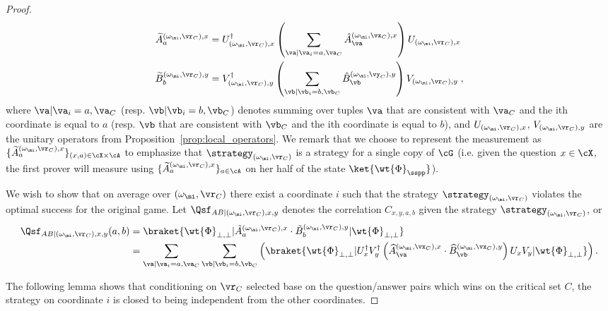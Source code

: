 \begin{proof}
	\begin{align*}
		\widetilde{A}^{(\omega_\mi,\vr_C),x}_a  = U_{(\omega_{\mi}, \vr_C),x}^\dagger \left(\sum_{\va | \va_i = a, \va_C}  \hat{A}^{(\omega_{\mi}, \vx_C),x}_\va  \right) U_{(\omega_{\mi}, \vr_C),x}\;\\
		\widetilde{B}^{(\omega_\mi,\vr_C),y}_b = V_{(\omega_{\mi}, \vr_C),y}^\dagger\left(\sum_{\vb | \vb_i = b, \vb_C}  \hat{B}^{(\omega_{\mi}, \vy_C),y}_\vb  \right) V_{(\omega_{\mi}, \vr_C),y}\;,
	\end{align*}
	where $\va | \va_i = a, \va_C$ (resp. $\vb | \vb_i = b, \vb_C$) denotes summing over tuples $\va$ that are consistent with $\va_C$ and the ith coordinate is equal to $a$ (resp. $\vb$ that are consistent with $\vb_C$  and the ith coordinate is equal to $b$), and $U_{(\omega_{\mi}, \vr_C),x}$, $V_{(\omega_{\mi}, \vr_C),y}$ are the unitary operators from Proposition~\ref{prop:local_operators}. We remark that we choose to represent the measurement as $\{\widetilde{A}^{(\omega_\mi,\vr_C),x}_a\}_{(x,a) \in \cX \times \cA}$ to emphasize that $\strategy_{(\omega_\mi,\vr_C)}$ is a strategy for a single copy of $\cG$ (i.e. given the question $x \in \cX$, the first prover will measure using $\{\widetilde{A}^{(\omega_\mi,\vr_C),x}_a\}_{a \in \cA}$ on her half of the state $\ket{\wt{\Phi}_\sspp}$). 
	
	We wish to show that on average over $(\omega_\mi,\vr_C)$ there exist a coordinate $i$ such that the strategy $\strategy_{(\omega_\mi,\vr_C)}$ violates the optimal success for the original game. Let $\Qsf_{A B | (\omega_{\mi}, \vr_C), x,y}$ denotes the correlation $C_{x,y,a,b}$ given the strategy $\strategy_{(\omega_{\mi}, \vr_C)}$, or
	\begin{align} 
		\nonumber \Qsf_{A B | (\omega_{\mi}, \vr_C), x,y}(a,b) &=   \braket{\wt{\Phi}_{\bot, \bot}| \tilde{A}^{(\omega_\mi,\vr_C),x}_a \cdot \tilde{B}^{(\omega_\mi,\vr_C),y}_b|\wt{\Phi}_{\bot, \bot}} \\
		&= \sum_{\va | \va_i = a, \va_C}\sum_{\vb | \vb_i = b, \vb_C} \left(  \braket{\wt{\Phi}_{\bot, \bot}|  U_{x}^\dagger  V_{y}^\dagger\left( \widehat{A}^{(\omega_{\mi}, \vx_C),x}_\va \cdot  \widehat{B}^{(\omega_{\mi}, \vx_C),y}_\vb \right) U_{x}  V_{y}|\wt{\Phi}_{\bot, \bot}}\right).
		\label{eq:main-lemma-0}
	\end{align}
	
	The following lemma shows that conditioning on $\vr_C$ selected base on the question/answer pairs which wins on the critical set $C$, the strategy on coordinate $i$ is closed to being independent from the other coordinates. 


\end{proof}
